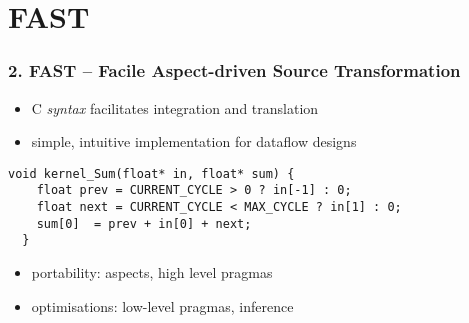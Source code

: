 \section{FAST}

\begin{frame}[fragile]
  \frametitle{2. FAST -- Facile Aspect-driven Source Transformation}
  \begin{itemize}
  \item C \emph{syntax} facilitates integration and translation
  \item simple, intuitive implementation for dataflow designs
  \end{itemize}
  \begin{lstlisting}[style=MaxC,   basicstyle=\scriptsize]
  void kernel_Sum(float* in, float* sum) {
    float prev = CURRENT_CYCLE > 0 ? in[-1] : 0;
    float next = CURRENT_CYCLE < MAX_CYCLE ? in[1] : 0;
    sum[0]  = prev + in[0] + next;
  }
  \end{lstlisting}

  \begin{itemize}
  \item portability: aspects, high level pragmas
  \item optimisations: low-level pragmas, inference
  \end{itemize}

  \vspace{-0.5cm}

  \begin{figure}[!ht]
    \centering
    \def\svgwidth{\linewidth}
    
    \label{fastcc}
  \end{figure}
\end{frame}